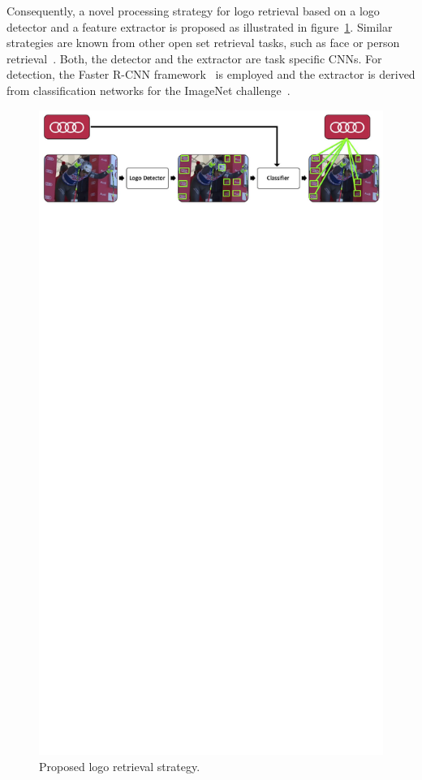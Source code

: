 \documentclass[a4paper,twoside]{article}
\begin{document}
Consequently, a novel processing strategy for logo retrieval based on a logo detector and a feature extractor is proposed as illustrated in figure~\ref{fig:pipeline}. Similar strategies are known from other open set retrieval tasks, such as face or person retrieval~\cite{bauml2010,herrmann2015b}. Both, the detector and the extractor are task specific \acp{CNN}. For detection, the Faster R-CNN framework~\cite{ren2015} is employed and the extractor is derived from classification networks for the ImageNet challenge~\cite{deng2009}.
%
\begin{figure}[t]
  \centering
  \includegraphics[width=\linewidth, trim=0cm 25.4cm 0cm 0cm, clip]{img/outline.pdf}
  \caption{Proposed logo retrieval strategy.}
  \label{fig:pipeline}
\end{figure}
\end{document}
